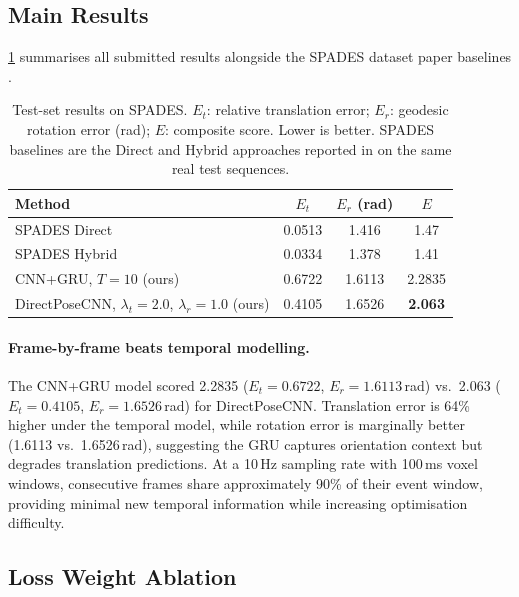 \documentclass[10pt,twocolumn,letterpaper]{article}
\begin{document}
\subsection{Main Results}
\label{sec:results}

\cref{tab:main} summarises all submitted results alongside the SPADES
dataset paper baselines \cite{spades2024}.

\begin{table}[h]
\centering
\small
\setlength{\tabcolsep}{4pt}
\caption{Test-set results on SPADES.  $E_t$: relative translation
error; $E_r$: geodesic rotation error (rad); $E$: composite score.
Lower is better.  SPADES baselines are the Direct and Hybrid approaches
reported in \cite{spades2024} on the same real test sequences.}
\label{tab:main}
\begin{tabular}{lccc}
\toprule
Method & $E_t$ & $E_r$ (rad) & $E$ \\
\midrule
SPADES Direct \cite{spades2024}  & 0.0513 & 1.416 & 1.47 \\
SPADES Hybrid \cite{spades2024}  & 0.0334 & 1.378 & 1.41 \\
\midrule
CNN+GRU, $T{=}10$ (ours)         & 0.6722 & 1.6113 & 2.2835 \\
DirectPoseCNN, $\lambda_t{=}2.0$, $\lambda_r{=}1.0$ (ours)
                                  & 0.4105 & 1.6526 & \textbf{2.063} \\
\bottomrule
\end{tabular}
\end{table}

\paragraph{Frame-by-frame beats temporal modelling.}
The CNN+GRU model scored 2.2835 ($E_t=0.6722$, $E_r=1.6113$\,rad)
vs.\ 2.063 ($E_t=0.4105$, $E_r=1.6526$\,rad) for DirectPoseCNN.
Translation error is 64\% higher under the temporal model, while
rotation error is marginally better (1.6113 vs.\ 1.6526\,rad),
suggesting the GRU captures orientation context but degrades
translation predictions.  At a 10\,Hz sampling rate with 100\,ms
voxel windows, consecutive frames share approximately 90\% of their
event window, providing minimal new temporal information while
increasing optimisation difficulty.

\subsection{Loss Weight Ablation}
\label{sec:ablation}
\end{document}
